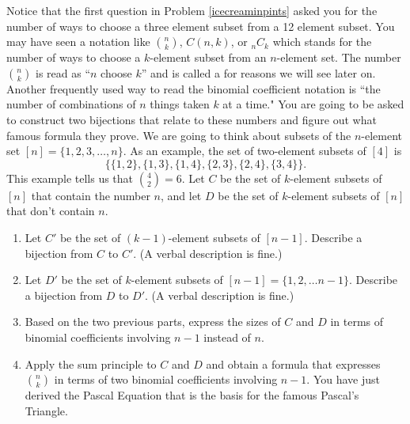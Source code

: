 \iteme Notice that the first question in Problem \ref{icecreaminpints} asked
you for the number of ways to choose a three element subset from a 12
element subset.  You may have seen a notation like
$n\choose k$, $C(n,k)$, or $_nC_k$ which stands for the number of ways to
choose a
$k$-element subset from an
$n$-element set.  The number $n\choose k$ is read as ``$n$ choose $k$'' and is
called a
  for
reasons we will see later on.  Another frequently used  way to read the
binomial coefficient notation  is ``the number of combinations
 of
$n$ things taken $k$ at a time." You are going to be asked to construct
two bijections that relate to these numbers and figure out what famous
formula they prove.  We are going to think about subsets of the
$n$-element set $[n] =
\{1,2,3,\ldots, n\}$. As an example, the set of two-element subsets of
$[4]$ is
$$\{\{1,2\}, \{1,3\}, \{1,4\}, \{2,3\}, \{2,4\}, \{3,4\}\}.$$  This
example tells us that ${4\choose 2} = 6$. Let
$C$ be the set of $k$-element subsets of $[n]$ that contain
the number
$n$, and let
$D$ be the set of $k$-element subsets of $[n]$ that don't
contain $n$.  
\begin{enumerate} 
\item Let $C'$ be the set of $(k-1)$-element subsets of
$[n-1]$.  Describe a bijection from $C$ to $C'$.  (A verbal
description is fine.)
\item Let $D'$ be the set of $k$-element subsets of
$[n-1]=\{1,2,\ldots n-1\}$.  Describe a bijection from $D$ to
$D'$. (A verbal description is fine.)
\item Based on the two previous parts, express the sizes of
$C$ and $D$ in terms of binomial coefficients involving $n-1$
instead of $n$.
\item Apply the sum principle to $C$ and $D$ and obtain a
formula that expresses $n\choose k$ in terms of two binomial
coefficients involving
$n-1$.  You have just derived the Pascal Equation that is the
basis for the famous Pascal's Triangle.
\end{enumerate}\label{Pascal} 

